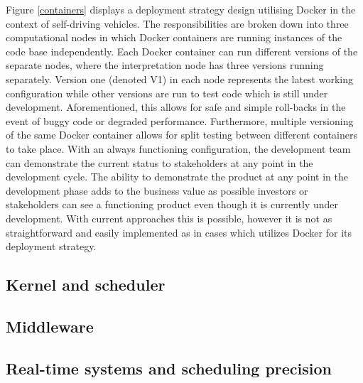Figure \ref{containers} displays a deployment strategy design utilising Docker in the context of self-driving vehicles. The responsibilities are broken down into three computational nodes in which Docker containers are running instances of the code base independently. Each Docker container can run different versions of the separate nodes, where the interpretation node has three versions running separately. Version one (denoted V1) in each node represents the latest working configuration while other versions are run to test code which is still under development. Aforementioned, this allows for safe and simple roll-backs in the event of buggy code or degraded performance. Furthermore, multiple versioning of the same Docker container allows for split testing between different containers to take place. With an always functioning configuration, the development team can demonstrate the current status to stakeholders at any point in the development cycle. The ability to demonstrate the product at any point in the development phase adds to the business value as possible investors or stakeholders can see a functioning product even though it is currently under development. With current approaches this is possible, however it is not as straightforward and easily implemented as in cases which utilizes Docker for its deployment strategy.\\

\subsection{Kernel and scheduler}
\subsection{Middleware}



\subsection{Real-time systems and scheduling precision}

